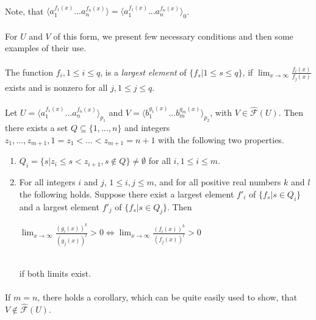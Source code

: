 \paragraph{}
Note, that $\langle a_{1}^{f_{1}(x)}...a_{n}^{f_{n}(x)} \rangle = \langle a_{1}^{f_{1}(x)}...a_{n}^{f_{n}(x)} \rangle_{0} $.

\paragraph{}
For $U$ and $V$ of this form, we present few necessary conditions and then some examples of their use.

\paragraph{}
\oznacenie The function $f_{i}, 1 \leq i \leq q$, is a \emph{largest element} of $\{ f_{s} | 1 \leq s \leq q \}$, if $\lim_{x\to \infty}\frac{f_{i}(x)}{f_{j}(x)}$ exists and is nonzero for all $j, 1 \leq j \leq q$.

\paragraph{}
\cveta Let $U = \langle a_{1}^{f_{1}(x)}...a_{n}^{f_{n}(x)} \rangle_{p_{1}} $ and $V = \langle b_{1}^{g_{1}(x)}...b_{m}^{g_{m}(x)} \rangle_{p_{2}} $, with $V \in \hat{\mathcal{F}}(U) $. Then there exists a set $Q \subseteq \{ 1, ..., n \} $ and integers $z_{1}, ..., z_{m+1}, 1=z_{1} < ... < z_{m+1} = n+1 $ with the following two properties.
\begin{enumerate}
\item $Q_{i} = \{ s | z_{i} \leq s < z_{i+1}, s \notin Q \} \neq \emptyset $ for all $i, 1 \leq i \leq m$.
\item For all integers $i$ and $j$, $1 \leq i, j \leq m$, and for all positive real numbers $k$ and $l$ the following holds. Suppose there exist a largest element $f'_{i}$ of $\{ f_{s} | s \in Q_{i} \} $ and a largest element $f'_{j}$ of $\{ f_{s} | s \in Q_{j} \} $. Then \\
\centerline{$\lim_{x \to \infty}\frac{(g_{i}(x))^{k}}{(g_{j}(x))^{l}} > 0 \Leftrightarrow \lim_{x \to \infty}\frac{(f_{i}(x))^{k}}{(f_{j}(x))^{l}} > 0$} \\
if both limits exist.
\end{enumerate} 

\paragraph{}
If $m = n$, there holds a corollary, which can be quite easily used to show, that $V \notin \hat{\mathcal{F}}(U)$.

